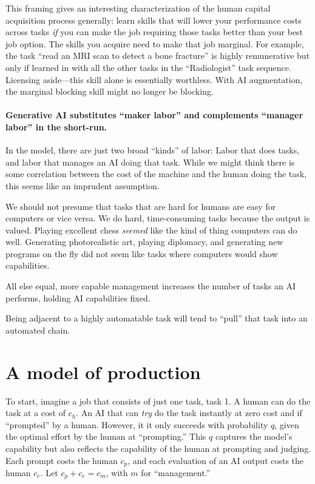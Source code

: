 \documentclass{article}
\begin{document}
This framing gives an interesting characterization of the human capital acquisition process  generally: learn skills that will lower your performance costs across tasks \emph{if} you can make the job requiring those tasks better than your best job option.
The skills you acquire need to make that job marginal. 
For example, the task ``read an MRI scan to detect a bone fracture'' is highly remunerative but only if learned in with all the other tasks in the ``Radiologist'' task sequence.
Licensing aside---this skill alone is essentially worthless.  
With AI augmentation, the marginal blocking skill might no longer be blocking. 

\paragraph{Generative AI substitutes ``maker labor'' and complements ``manager labor'' in the short-run.}
In the model, there are just two broad ``kinds'' of labor: 
Labor that does tasks, and labor that manages an AI doing that task. 
While we might think there is some correlation between the cost of the machine and the human doing the task, this seems like an imprudent assumption.

We should not presume that tasks that are hard for humans are easy for computers or vice versa. 
We do hard, time-consuming tasks because the output is valued. 
Playing excellent chess \emph{seemed} like the kind of thing computers can do well. 
Generating photorealistic art, playing diplomacy, and generating new programs on the fly did not seem like tasks where computers would show capabilities.

All else equal, more capable management increases the number of tasks an AI performs, holding AI capabilities fixed. 

Being adjacent to a highly automatable task will tend to ``pull'' that task into an automated chain.

\section{A model of production}
To start, imagine a job that consists of just one task, task 1.
A human can do the task at a cost of $c_h$.
An AI that can \emph{try} do the task instantly at zero cost and if ``prompted'' by a human.
However, it it only succeeds with probability $q$, given the optimal effort by the human at ``prompting.''
This $q$ captures the model's capability but also reflects the capability of the human at prompting and judging.
Each prompt costs the human $c_p$, and each evaluation of an AI output costs the human $c_e$.
Let $c_p + c_e = c_m$, with $m$ for ``management.''
\end{document}
